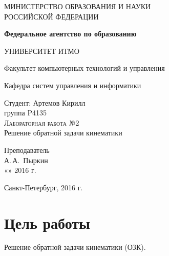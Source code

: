 \documentclass[a4paper,14pt]{extreport}
\begin{document}
	
	\begin{titlepage}
		\begin{center}
			\large
			МИНИСТЕРСТВО ОБРАЗОВАНИЯ И НАУКИ\\ РОССИЙСКОЙ ФЕДЕРАЦИИ
			
			\textbf{Федеральное агентство по образованию}
			\vspace{0.5cm}
			
			УНИВЕРСИТЕТ ИТМО
			\vspace{0.25cm}
			
			Факультет компьютерных технологий и управления
			
			Кафедра систем управления и информатики
			\vfill
			
			
			Студент: Артемов Кирилл\\
			группа P4135\\
					
			\textsc{Лабораторная работа №2}\\[5mm]
			
			{\LARGE Решение обратной задачи кинематики}
			\bigskip
			
		\end{center}
		\vfill
		
		\newlength{\ML}
		\hfill\begin{minipage}{0.4\textwidth}
			Преподаватель\\
			\underline{\hspace{\ML}} А.\,А.~Пыркин\\
			«\underline{\hspace{0.7cm}}» \underline{\hspace{2cm}} 2016 г.
		\end{minipage}%
		\bigskip

		\vfill
		
		\begin{center}
			Санкт-Петербург, 2016 г.
		\end{center}
	\end{titlepage}
	
	\section{Цель работы}
	Решение обратной задачи кинематики (ОЗК).
	
\end{document}
